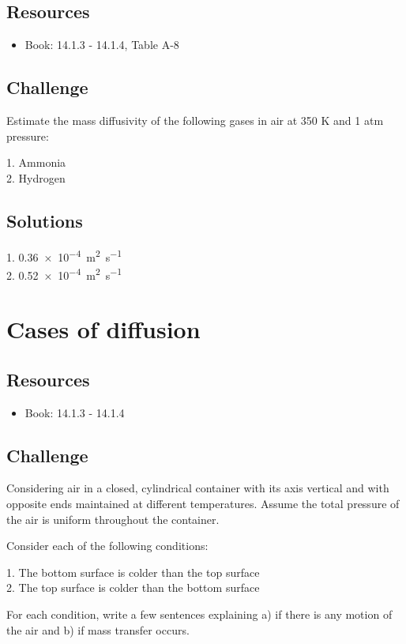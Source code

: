 \subsection*{Resources}
\begin{itemize}
    \item Book: 14.1.3 - 14.1.4, Table A-8
\end{itemize}

\subsection*{Challenge}
Estimate the mass diffusivity of the following gases in air at 350 K and 1 atm pressure:

1. Ammonia\\
2. Hydrogen

\subsection*{Solutions}
1. \SI{0.36e-4}{\square\meter\per\second}\\
2. \SI{0.52e-4}{\square\meter\per\second}




\newpage
\section{Cases of diffusion}

\subsection*{Resources}
\begin{itemize}
    \item Book: 14.1.3 - 14.1.4
\end{itemize}

\subsection*{Challenge}
Considering air in a closed, cylindrical container with its axis vertical and with opposite ends maintained at different temperatures. Assume the total pressure of the air is uniform throughout the container.

Consider each of the following conditions:

1. The bottom surface is colder than the top surface\\
2. The top surface is colder than the bottom surface

For each condition, write a few sentences explaining a) if there is any motion of the air and b) if mass transfer occurs.


